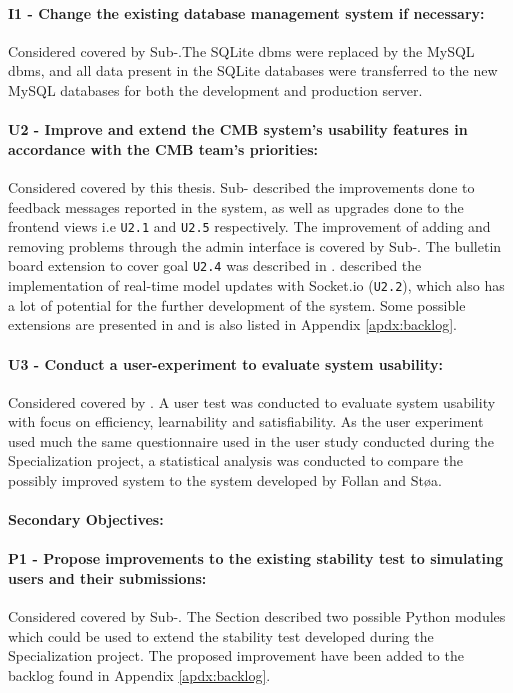 \paragraph*{I1 - Change the existing database management system if necessary:} Considered covered by Sub-.The SQLite \gls{dbms} were replaced by the MySQL \gls{dbms}, and all data present in the SQLite databases were transferred to the new MySQL databases for both the development and production server.

\paragraph*{U2 - Improve and extend the CMB system’s usability features in accordance with the CMB team’s priorities:} Considered covered by this thesis. Sub- described the improvements done to feedback messages reported in the system, as well as upgrades done to the frontend views i.e \texttt{U2.1} and \texttt{U2.5} respectively. The improvement of adding and removing problems through the admin interface is covered by Sub-. The bulletin board extension to cover goal \texttt{U2.4} was described in .  described the implementation of real-time model updates with Socket.io (\texttt{U2.2}), which also has a lot of potential for the further development of the system. Some possible extensions are presented in  and is also listed in Appendix \ref{apdx:backlog}.

\paragraph*{U3 - Conduct a user-experiment to evaluate system usability:} Considered covered by . A user test was conducted to evaluate system usability with focus on efficiency, learnability and satisfiability. As the user experiment used much the same questionnaire used in the user study conducted during the Specialization project, a statistical analysis was conducted to compare the possibly improved system to the system developed by Follan and Støa.

\paragraph*{Secondary Objectives:} \hfill

\paragraph*{P1 - Propose improvements to the existing stability test to simulating users and their submissions:} Considered covered by Sub-. The Section described two possible Python modules which could be used to extend the stability test developed during the Specialization project. The proposed improvement have been added to the backlog found in Appendix \ref{apdx:backlog}.

